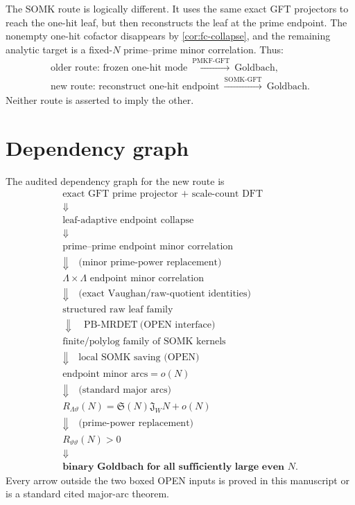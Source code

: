 \documentclass[11pt]{article}
\theoremstyle{definition}
\theoremstyle{remark}
\newcommand{\1}{\mathbf 1}
\newcommand{\SG}{\mathfrak S}
\newcommand{\Jw}{\mathfrak J_W}
\newcommand{\PMKF}{\mathrm{PMKF}\text{-}\mathrm{GFT}}
\newcommand{\SOMK}{\mathrm{SOMK}\text{-}\mathrm{GFT}}
\newcommand{\PBM}{\mathrm{PB}\text{-}\mathrm{MRDET}}
\begin{document}
The SOMK route is logically different.  It uses the same exact GFT projectors to reach the one-hit leaf, but then reconstructs the leaf at the prime endpoint.  The nonempty one-hit cofactor disappears by \cref{cor:fc-collapse}, and the remaining analytic target is a fixed-\(N\) prime--prime minor correlation.  Thus:
\[
 \begin{array}{c}
 \text{older route: frozen one-hit mode}\ \xrightarrow{\PMKF}\ \text{Goldbach},\\[1mm]
 \text{new route: reconstruct one-hit endpoint}\ \xrightarrow{\SOMK}\ \text{Goldbach}.
 \end{array}
\]
Neither route is asserted to imply the other.

\section{Dependency graph}\label{app:graph}

The audited dependency graph for the new route is
\[
\boxed{
\begin{array}{c}
\text{exact GFT prime projector + scale-count DFT}\\
\Downarrow\\
\text{leaf-adaptive endpoint collapse}\\
\Downarrow\\
\text{prime--prime endpoint minor correlation}\\
\Downarrow\quad\text{(minor prime-power replacement)}\\
\Lambda\times\Lambda\text{ endpoint minor correlation}\\
\Downarrow\quad\text{(exact Vaughan/raw-quotient identities)}\\
\text{structured raw leaf family}\\
\Downarrow\quad\boxed{\PBM\ \text{(OPEN interface)}}\\
\text{finite/polylog family of SOMK kernels}\\
\Downarrow\quad\boxed{\text{local SOMK saving (OPEN)}}\\
\text{endpoint minor arcs}=o(N)\\
\Downarrow\quad\text{(standard major arcs)}\\
R_{\Lambda\vartheta}(N)=\SG(N)\Jw N+o(N)\\
\Downarrow\quad\text{(prime-power replacement)}\\
R_{\vartheta\vartheta}(N)>0\\
\Downarrow\\
\textbf{binary Goldbach for all sufficiently large even }N.
\end{array}}
\]
Every arrow outside the two boxed OPEN inputs is proved in this manuscript or is a standard cited major-arc theorem.
\end{document}
